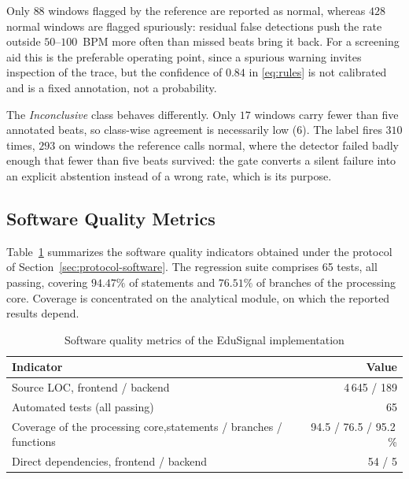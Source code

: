 \documentclass[conference]{IEEEtran}
\begin{document}
Only $88$ windows flagged by the reference are reported as normal, whereas $428$ normal windows are flagged spuriously: residual false detections push the rate outside $50$--$100$~BPM more often than missed beats bring it back. For a screening aid this is the preferable operating point, since a spurious warning invites inspection of the trace, but the confidence of $0.84$ in \eqref{eq:rules} is not calibrated and is a fixed annotation, not a probability.

The \emph{Inconclusive} class behaves differently. Only $17$ windows carry fewer than five annotated beats, so class-wise agreement is necessarily low ($6$). The label fires $310$ times, $293$ on windows the reference calls normal, where the detector failed badly enough that fewer than five beats survived: the gate converts a silent failure into an explicit abstention instead of a wrong rate, which is its purpose.

\subsection{Software Quality Metrics}
\label{sec:results-software}

Table~\ref{tab:quality} summarizes the software quality indicators obtained under the protocol of Section~\ref{sec:protocol-software}. The regression suite comprises 65 tests, all passing, covering $94.47\%$ of statements and $76.51\%$ of branches of the processing core. Coverage is concentrated on the analytical module, on which the reported results depend.

\begin{table}[!t]
\caption{Software quality metrics of the EduSignal implementation}
\centering
\renewcommand{\arraystretch}{1.15}
\begin{tabular}{p{4.4cm}r}
\toprule
\textbf{Indicator} & \textbf{Value}\\
\midrule
Source LOC, frontend / backend & 4\,645 / 189\\
Automated tests (all passing) & 65\\
Coverage of the processing core,\newline statements / branches / functions & 94.5 / 76.5 / 95.2\,\%\\
Direct dependencies, frontend / backend & 54 / 5\\
\bottomrule
\end{tabular}
\label{tab:quality}
\end{table}
\end{document}
